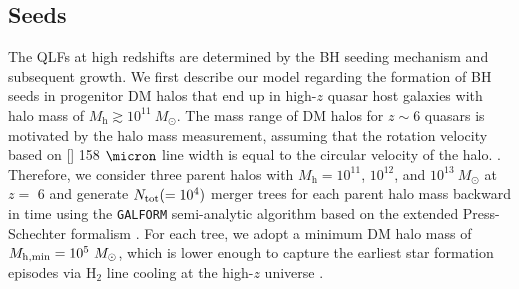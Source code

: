 \documentclass[twocolumn, twocolappendix]{aastex63}
\newcommand{\Msun}{M_\odot}
\newcommand{\Mh}{M_\mathrm{h}}
\begin{document}
\begin{CJK*}{UTF8}{gbsn}
\subsection{Seeds}\label{sec:seed}
The QLFs at high redshifts are determined by the BH seeding mechanism and subsequent growth. 
We first describe our model regarding the formation of BH seeds in progenitor DM halos 
that end up in high-$z$ quasar host galaxies with halo mass of $\Mh \gtrsim 10^{11}~\Msun$.
The mass range of DM halos for $z\sim 6$ quasars is motivated by the halo mass measurement, 
assuming that the rotation velocity based on [] 158 $\micron$ line width is equal to the circular velocity of the halo.
\citep{2002ApJ...578...90F,2013ApJ...773...44W,2019ApJ...872L..29S}.
Therefore, we consider three parent halos with $\Mh = 10^{11}$, $10^{12}$, and $10^{13} ~\Msun$ at $z=$ 6
and generate $N_{\rm tot} (= 10^4)$ merger trees for each parent halo mass backward in time using the {\tt GALFORM} 
semi-analytic algorithm based on the extended Press-Schechter formalism 
\citep{1974ApJ...187..425P,2000MNRAS.319..168C,2008MNRAS.383..557P}.
For each tree, we adopt a minimum DM halo mass of $M_{\rm h,min}=10^5~\Msun$, which is lower enough to capture 
the earliest star formation episodes via H$_2$ line cooling at the high-$z$ universe \citep{1996ApJ...464..523H,1997ApJ...474....1T}.



\end{CJK*}
\end{document}
